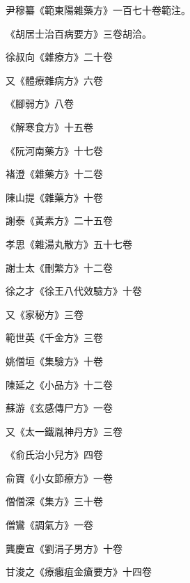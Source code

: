 \begin{pinyinscope}
 尹穆纂《範東陽雜藥方》一百七十卷範注。



 《胡居士治百病要方》三卷胡洽。



 徐叔向《雜療方》二十卷



 又《體療雜病方》六卷



 《腳弱方》八卷



 《解寒食方》十五卷



 《阮河南藥方》十七卷



 褚澄《雜藥方》十二卷



 陳山提《雜藥方》十卷



 謝泰《黃素方》二十五卷



 孝思《雜湯丸散方》五十七卷



 謝士太《刪繁方》十二卷



 徐之才《徐王八代效驗方》十卷



 又《家秘方》三卷



 範世英《千金方》三卷



 姚僧垣《集驗方》十卷



 陳延之《小品方》十二卷



 蘇游《玄感傳尸方》一卷



 又《太一鐵胤神丹方》三卷



 《俞氏治小兒方》四卷



 俞寶《小女節療方》一卷



 僧僧深《集方》三十卷



 僧鸞《調氣方》一卷



 龔慶宣《劉涓子男方》十卷



 甘浚之《療癰疽金瘡要方》十四卷




\end{pinyinscope}
